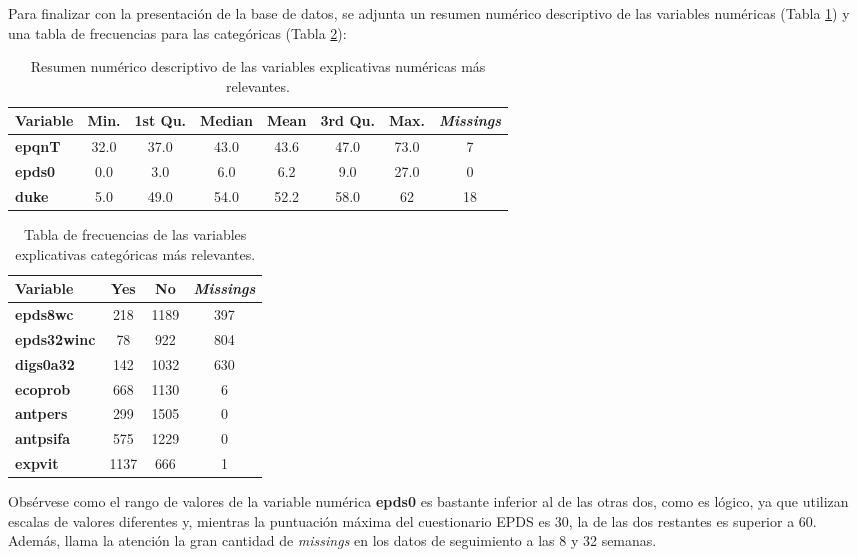 Para finalizar con la presentación de la base de datos, se adjunta un resumen numérico descriptivo de las variables numéricas (Tabla \ref{tab:5}) y una tabla de frecuencias para las categóricas (Tabla \ref{tab:6}):
\begin{table} [h]
	\centering
	\begin{tabular}{l c c c c c c c}
		\toprule
		\textbf{Variable} & \textbf{Min.} & \textbf{1st Qu.} & \textbf{Median} & \textbf{Mean} & \textbf{3rd Qu.} & \textbf{Max.} & \textbf{\textit{Missings}}\\
		\midrule
		\textbf{epqnT} &  32.0 &  37.0 & 43.0  & 43.6 & 47.0 & 73.0 & 7\\
		\textbf{epds0} & 0.0 &  3.0 &  6.0 & 6.2 &  9.0 & 27.0 & 0 \\
		\textbf{duke} & 5.0 & 49.0 & 54.0 & 52.2 & 58.0 & 62 & 18\\
		\bottomrule
	\end{tabular}
	\caption{Resumen numérico descriptivo de las variables explicativas numéricas más relevantes.}
	\label{tab:5}
\end{table}

\begin{table} [H]
	\centering
	\begin{tabular}{l c c c }
		\toprule
		\textbf{Variable} & \textbf{Yes} & \textbf{No} & \textbf{\textit{Missings}} \\
		\midrule
		\textbf{epds8wc} &   218 & 1189 & 397\\
		\textbf{epds32winc} & 78 & 922 & 804\\
		\textbf{digs0a32} & 142 & 1032 & 630 \\
		\textbf{ecoprob} &  668 & 1130 & 6\\
		\textbf{antpers} &299 & 1505 & 0 \\
		\textbf{antpsifa} & 575 & 1229&0 \\
		\textbf{expvit} &  1137 & 666 & 1\\
		\bottomrule
	\end{tabular}
	\caption{Tabla de frecuencias de las variables explicativas categóricas más relevantes.}
	\label{tab:6}
\end{table}

Obsérvese como el rango de valores de la variable numérica \textbf{epds0} es bastante inferior al de las otras dos, como es lógico, ya que utilizan escalas de valores diferentes y, mientras la puntuación máxima del cuestionario EPDS es 30, la de las dos restantes es superior a 60. Además, llama la atención la gran cantidad de \textit{missings} en los datos de seguimiento a las 8 y 32 semanas.

